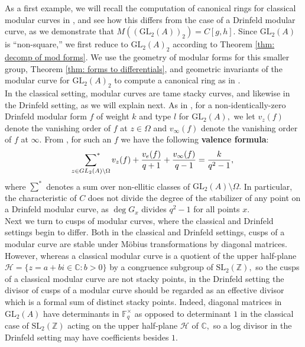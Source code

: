 \documentclass[11pt]{amsart}
\theoremstyle{definition}
\numberwithin{equation}{section}
\newcommand{\GL}{\mathrm{GL}} 	%
\newcommand{\SL}{\mathrm{SL}} 	%
\newcommand{\cH}{\mathcal{H}}		%
\newcommand{\sX}{\mathscr{X}}		%
\newcommand{\bbC}{\mathbb{C}}		%
\newcommand{\bbF}{\mathbb{F}}		%
\newcommand{\bbZ}{\mathbb{Z}}		%
\begin{document}
As a first example, we will recall the computation of canonical rings for classical modular curves in \cite{VZB}, and see how this differs from the case of a Drinfeld modular curve, as we demonstrate that $M((\GL_2(A))_2)=C[g,h].$ Since $\GL_2(A)$ is ``non-square,'' we first reduce to $\GL_2(A)_2$ according to Theorem \ref{thm: decomp of mod forms}. We use the geometry of modular forms for this smaller group, Theorem \ref{thm: forms to differentials}, and geometric invariants of the modular curve for $\GL_2(A)_2$ to compute a canonical ring as in \cite{VZB}.\\

In the classical setting, modular curves are tame stacky curves, and likewise in the Drinfeld setting, as we will explain next. As in \cite[Definition $(3.5)$]{Gekeler-survey-Drinfeld-modular-forms}, for a non-identically-zero Drinfeld modular form $f$ of weight $k$ and type $l$ for $\GL_2(A),$ we let $v_z(f)$ denote the vanishing order of $f$ at $z\in \Omega$ and $v_{\infty}(f)$ denote the vanishing order of $f$ at $\infty.$ From \cite[Equation $(3.10)$]{Gekeler-survey-Drinfeld-modular-forms}, for such an $f$ we have the following \textbf{valence formula}: 
\[\sideset{}{^*}\sum_{z\in GL_2(A)\setminus \Omega}v_z(f)+\frac{v_e(f)}{q+1}+\frac{v_{\infty}(f)}{q-1}=\frac{k}{q^2-1},\]
where $\sum^*$ denotes a sum over non-ellitic classes of $\GL_2(A)\setminus \Omega.$ In particular, the characteristic of $C$ does not divide the degree of the stabilizer of any point on a Drinfeld modular curve, as $\deg G_x$ divides $q^2-1$ for all points $x.$\\

Next we turn to cusps of modular curves, where the classical and Drinfeld settings begin to differ. 
Both in the classical and Drinfeld settings, cusps of a modular curve are stable under M\"obius transformations by diagonal matrices. However, whereas a classical modular curve is a quotient of the upper half-plane $\cH=\{z=a+bi\in \bbC: b>0\}$ by a congruence subgroup of $\SL_2(\bbZ),$ 
so the cusps of a classical modular curve are not stacky points, in the Drinfeld setting the divisor of cusps of a modular curve should be regarded as an effective divisor which is a formal sum of distinct stacky points. Indeed, diagonal matrices in $\GL_2(A)$ have determinants in $\bbF_q^{\times}$ as opposed to determinant $1$ in the classical case of $\SL_2(\bbZ)$ acting on the upper half-plane $\cH$ of $\bbC,$ so a log divisor in the Drinfeld setting may have coefficients besides $1.$\\
\end{document}
